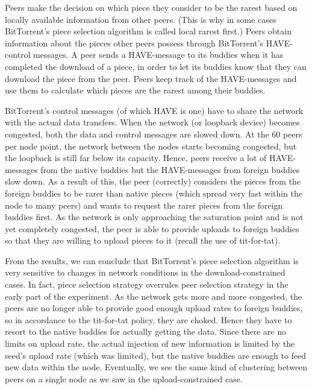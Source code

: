 \documentclass[10pt,letterpaper,twocolumn]{article}
\begin{document}
Peers make the decision on which piece they consider to be the rarest
based on locally available information from other peers. (This is why
in some cases BitTorrent's piece selection algorithm is called local
rarest first.) Peers obtain information about the pieces other peers
possess through BitTorrent's HAVE-control messages. A peer sends a
HAVE-message to its buddies when it has completed the download of a
piece, in order to let its buddies know that they can download the
piece from the peer. Peers keep track of the HAVE-messages and use
them to calculate which pieces are the rarest among their buddies.




BitTorrent's control messages (of which HAVE is one) have to share the
network with the actual data transfers. When the network (or loopback
device) becomes congested, both the data and control messages are
slowed down. At the 60 peers per node point, the network between the
nodes starts becoming congested, but the loopback is still far below
its capacity. Hence, peers receive a lot of HAVE-messages from the
native buddies but the HAVE-messages from foreign buddies slow
down. As a result of this, the peer (correctly) considers the pieces
from the foreign buddies to be rarer than native pieces (which spread
very fast within the node to many peers) and wants to request the
rarer pieces from the foreign buddies first. As the network is only
approaching the saturation point and is not yet completely congested,
the peer is able to provide uploads to foreign buddies so that they
are willing to upload pieces to it (recall the use of tit-for-tat).



From the results, we can conclude that BitTorrent's piece selection
algorithm is very sensitive to changes in network conditions in the
download-constrained cases. In fact, piece selection strategy
overrules peer selection strategy in the early part of the
experiment. As the network gets more and more congested, the peers are
no longer able to provide good enough upload rates to foreign buddies,
so in accordance to the tit-for-tat policy, they are choked. Hence
they have to resort to the native buddies for actually getting the
data. Since there are no limits on upload rate, the actual injection
of new information is limited by the seed's upload rate (which was
limited), but the native buddies are enough to feed new data within
the node. Eventually, we see the same kind of clustering between peers
on a single node as we saw in the upload-constrained case.
\end{document}
